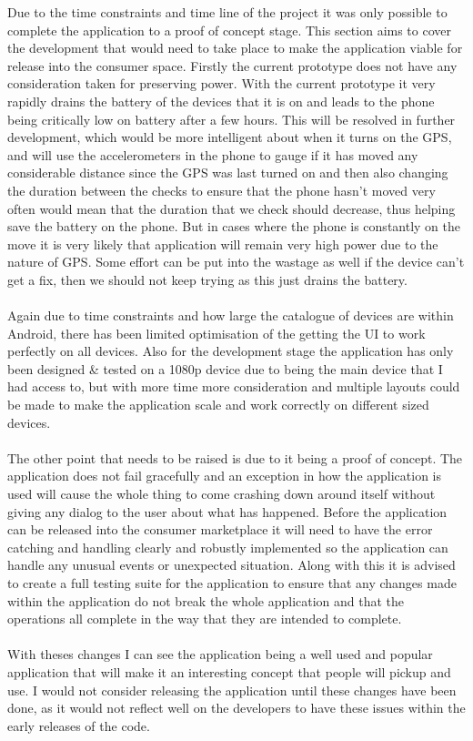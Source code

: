 Due to the time constraints and time line of the project it was only possible to complete the application to a proof of concept stage. This section aims to cover the development that would need to take place to make the application viable for release into the consumer space. Firstly the current prototype does not have any consideration taken for preserving power. With the current prototype it very rapidly drains the battery of the devices that it is on and leads to the phone being critically low on battery after a few hours. This will be resolved in further development, which would be more intelligent about when it turns on the GPS, and will use the accelerometers in the phone to gauge if it has moved any considerable distance since the GPS was last turned on and then also changing the duration between the checks to ensure that the phone hasn't moved very often would mean that the duration that we check should decrease, thus helping save the battery on the phone. But in cases where the phone is constantly on the move it is very likely that application will remain very high power due to the nature of GPS. Some effort can be put into the wastage as well if the device can't get a fix, then we should not keep trying as this just drains the battery.\\
\\
Again due to time constraints and how large the catalogue of devices are within Android, there has been limited optimisation of the getting the UI to work perfectly on all devices. Also for the development stage the application has only been designed \& tested on a 1080p device due to being the main device that I had access to, but with more time more consideration and multiple layouts could be made to make the application scale and work correctly on different sized devices.\\
\\
The other point that needs to be raised is due to it being a proof of concept. The application does not fail gracefully and an exception in how the application is used will cause the whole thing to come crashing down around itself without giving any dialog to the user about what has happened. Before the application can be released into the consumer marketplace it will need to have the error catching and handling clearly and robustly implemented so the application can handle any unusual events or unexpected situation. Along with this it is advised to create a full testing suite for the application to ensure that any changes made within the application do not break the whole application and that the operations all complete in the way that they are intended to complete.\\
\\
With theses changes I can see the application being a well used and popular application that will make it an interesting concept that people will pickup and use. I would not consider releasing the application until these changes have been done, as it would not reflect well on the developers to have these issues within the early releases of the code.

